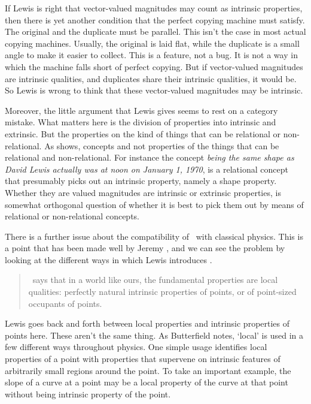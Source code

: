 \noindent  If Lewis is right that vector-valued magnitudes may count as intrinsic properties, then there is yet another condition that the perfect copying machine must satisfy. The original and the duplicate must be parallel. This isn't the case in most actual copying machines. Usually, the original is laid flat, while the duplicate is a small angle to make it easier to collect. This is a feature, not a bug. It is not a way in which the machine falls short of perfect copying. But if vector-valued magnitudes are intrinsic qualities, and duplicates share their intrinsic qualities, it would be. So Lewis is wrong to think that these vector-valued magnitudes may be intrinsic.

Moreover, the little argument that Lewis gives seems to rest on a category mistake. What matters here is the division of properties into intrinsic and extrinsic. But the properties on the kind of things that can be relational or non-relational.  As \citet{Humberstone1996}  shows, concepts and not properties of the things that can be relational and non-relational. For instance the concept \textit{being the same shape as David Lewis actually was at noon on January 1, 1970}, is a relational concept that presumably picks out an intrinsic property, namely a shape property. Whether they are valued magnitudes are intrinsic or extrinsic properties, is somewhat orthogonal question of whether it is best to pick them out by means of relational or non-relational concepts.

 There is a further issue about the compatibility of \HS\  with classical physics. This is a point that has been made well by Jeremy \citet{Butterfield2006},  and we can see the problem by looking at the different ways in which Lewis introduces \HS. 

\begin{quote}
\HS\ says that in a world like ours, the fundamental properties are local qualities: perfectly natural intrinsic properties of points, or of point-sized occupants of points. \citep[474]{Lewis1994a}
\end{quote}

\noindent Lewis goes back and forth between local properties and intrinsic properties of points here. These aren't the same thing. As Butterfield notes, `local'  is used in a few different ways throughout physics.  One simple usage identifies local properties of a point with properties that supervene on intrinsic features of arbitrarily small regions around the point. To take an important example, the slope of a curve at a point may be a local property of the curve at that point without being intrinsic property of the point.

